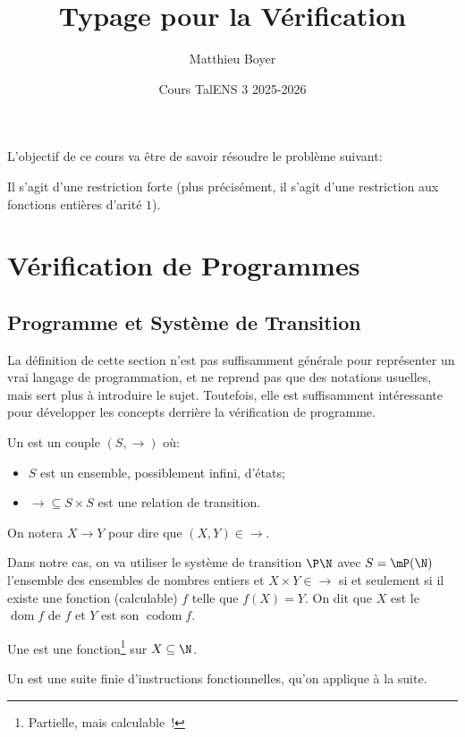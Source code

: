 \documentclass[info, math]{mpb-cours}
\title{Typage pour la Vérification}
\author{Matthieu Boyer}
\date{Cours TalENS 3 2025-2026}
\DeclareMathOperator{\dom}{dom}
\DeclareMathOperator{\codom}{codom}
\begin{document}
\bettertitle
L'objectif de ce cours va être de savoir résoudre le problème suivant:


Il s'agit d'une restriction forte (plus précisément, il s'agit d'une restriction aux fonctions
entières d'arité $1$).

\section{Vérification de Programmes}
\subsection{Programme et Système de Transition}
\begin{remarque}
	La définition de cette section n'est pas suffisamment générale pour représenter un vrai langage de
	programmation, et ne reprend pas que des notations usuelles, mais sert plus à introduire le sujet.
	Toutefois, elle est suffisamment intéressante pour développer les concepts derrière la vérification de
	programme.
\end{remarque}

\begin{definition}
	Un  est un couple $(S, \rightarrow)$ où:
	\begin{itemize}
		\item $S$ est un ensemble, possiblement infini, d'états;
		\item $\rightarrow \subseteq S \times S$ est une relation de transition.
	\end{itemize}
\end{definition}

On notera $X \to Y$ pour dire que $(X, Y) \in \rightarrow$.

Dans notre cas, on va utiliser le système de transition $\P\N$ avec $S = \mP(\N)$ l'ensemble des ensembles de
nombres entiers et $X \times Y \in \rightarrow$ si et seulement si il existe une fonction (calculable)
$f$ telle que $f(X) = Y$.
On dit que $X$ est le  $\dom f$ de $f$ et $Y$ est son  $\codom f$.

\begin{definition}
	Une  est une fonction\footnote{Partielle, mais calculable~!}
	sur $X \subseteq \N$.

	\smallskip

	Un  est une suite finie d'instructions fonctionnelles, qu'on applique à
	la suite.
\end{definition}
\end{document}
